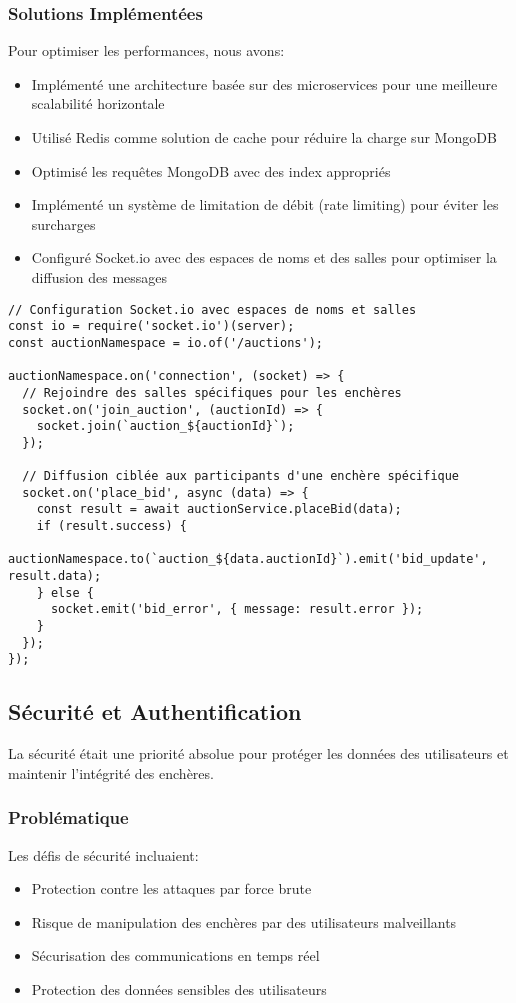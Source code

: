 \subsubsection{Solutions Implémentées}
Pour optimiser les performances, nous avons:
\begin{itemize}
    \item Implémenté une architecture basée sur des microservices pour une meilleure scalabilité horizontale
    \item Utilisé Redis comme solution de cache pour réduire la charge sur MongoDB
    \item Optimisé les requêtes MongoDB avec des index appropriés
    \item Implémenté un système de limitation de débit (rate limiting) pour éviter les surcharges
    \item Configuré Socket.io avec des espaces de noms et des salles pour optimiser la diffusion des messages
\end{itemize}

\begin{verbatim}
// Configuration Socket.io avec espaces de noms et salles
const io = require('socket.io')(server);
const auctionNamespace = io.of('/auctions');

auctionNamespace.on('connection', (socket) => {
  // Rejoindre des salles spécifiques pour les enchères
  socket.on('join_auction', (auctionId) => {
    socket.join(`auction_${auctionId}`);
  });
  
  // Diffusion ciblée aux participants d'une enchère spécifique
  socket.on('place_bid', async (data) => {
    const result = await auctionService.placeBid(data);
    if (result.success) {
      auctionNamespace.to(`auction_${data.auctionId}`).emit('bid_update', result.data);
    } else {
      socket.emit('bid_error', { message: result.error });
    }
  });
});
\end{verbatim}

\subsection{Sécurité et Authentification}
La sécurité était une priorité absolue pour protéger les données des utilisateurs et maintenir l'intégrité des enchères.

\subsubsection{Problématique}
Les défis de sécurité incluaient:
\begin{itemize}
    \item Protection contre les attaques par force brute
    \item Risque de manipulation des enchères par des utilisateurs malveillants
    \item Sécurisation des communications en temps réel
    \item Protection des données sensibles des utilisateurs
\end{itemize}

